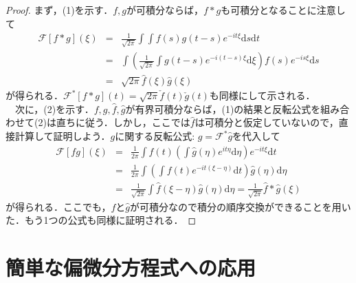\documentclass[a4j]{jsbook}
\numberwithin{theorem}{chapter}  %
\begin{document}
\begin{proof}
まず，(1)を示す．\(f, g\)が可積分ならば，\(f*g\)も可積分となることに注意して
\begin{eqnarray*}
\mathcal{F}[f*g](\xi)&=&\frac{1}{\sqrt{2\pi}}\int\int f(s)g(t-s)e^{-it\xi}\mathrm{d}s\mathrm{d}t \\
&=&\int\left(\frac{1}{\sqrt{2\pi}}\int g(t-s)e^{-i(t-s)\xi}\mathrm{d}\xi\right)f(s)e^{-is\xi}\mathrm{d}s \\
&=&\sqrt{2\pi}\hat{f}(\xi)\hat{g}(\xi)
\end{eqnarray*}
が得られる．\(\mathcal{F}^*[f*g](t)=\sqrt{2\pi}\check{f}(t)\check{g}(t)\)も同様にして示される．\\
　次に，(2)を示す．\(f, g, \hat{f}, \hat{g}\)が有界可積分ならば，(1)の結果と反転公式を組み合わせて(2)は直ちに従う．しかし，ここでは\(\hat{f}\)は可積分と仮定していないので，直接計算して証明しよう．\(g\)に関する反転公式: \(g=\mathcal{F}^*\hat{g}\)を代入して
\begin{eqnarray*}
\mathcal{F}[fg](\xi)&=&\frac{1}{2\pi}\int f(t)\left(\int\hat{g}(\eta)e^{it\eta}\mathrm{d}\eta\right)e^{-it\xi}\mathrm{d}t \\
&=&\frac{1}{2\pi}\int\left(\int f(t)e^{-it(\xi-\eta)}\mathrm{d}t\right)\hat{g}(\eta)\mathrm{d}\eta \\
&=&\frac{1}{\sqrt{2\pi}}\int\hat{f}(\xi-\eta)\hat{g}(\eta)\mathrm{d}\eta=\frac{1}{\sqrt{2\pi}}\hat{f}*\hat{g}(\xi)
\end{eqnarray*}
が得られる．ここでも，\(f\)と\(\hat{g}\)が可積分なので積分の順序交換ができることを用いた．もう1つの公式も同様に証明される．
\end{proof}
\section{簡単な偏微分方程式への応用} \label{sec3-9}
\end{document}
